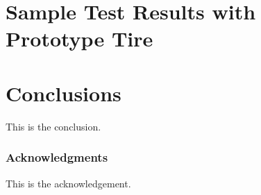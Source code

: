 \documentclass{article}
\begin{document}
\section{Sample Test Results with Prototype Tire}

\section{Conclusions}

This is the conclusion.

\subsubsection*{Acknowledgments}
This is the acknowledgement.




\end{document}
